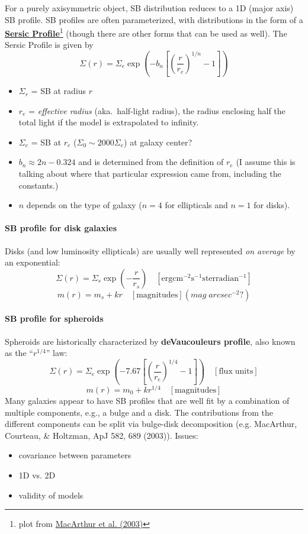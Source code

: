 \documentclass{article}
\newcommand{\mynotes}[1]{\textcolor{cadmiumgreen}{#1}}
\begin{document}
For a purely axisymmetric object, SB distribution reduces to a 1D
(major axis) SB profile.
SB profiles are often parameterized, with distributions in the form
of a
\href{http://astronomy.nmsu.edu/holtz/a555/html/diagrams/a616/sersic.htm}
{\textbf{Sersic Profile}}\footnote{plot from
\href{http://adsabs.harvard.edu/abs/2003ApJ...582..689M}
{MacArthur et al. (2003)}}
(though there are other forms that can be used as well).
The Sersic Profile is given by
\[
    \Sigma(r) = \Sigma_{e}\exp \left( -b_{n} \left[ \left(
    \frac{r}{r_{e}} \right) ^{1/n}-1 \right] \right)
    \]
\begin{itemize}
    \item $\Sigma_{r}$ = SB at radius $r$
    \item $r_{e}$ = \textit{effective radius} (aka.\ half-light radius),
        the radius enclosing half the
        total light if the model is extrapolated to infinity.
    \item $\Sigma_{e}$ = SB at $r_{e}$
        ($\Sigma_{0} \sim 2000\Sigma_{e}$) \mynotes{at galaxy center?}
    \item $b_{n} \approx 2n - 0.324$ and is determined from the definition of
        $r_{e}$ \mynotes{(I assume this is talking about where that particular
        expression came from, including the constants.)}
    \item $n$ depends on the type of galaxy ($n=4$ for ellipticals and $n=1$
        for disks).
\end{itemize}

\paragraph{SB profile for disk galaxies}
Disks (and low luminosity ellipticals) are usually well represented \emph{on
average} by an exponential:
\[
    \Sigma(r) = \Sigma_{s}\exp\left(-\frac{r}{r_{s}}\right)
    \quad \mathrm{[erg cm^{-2} s^{-1} sterradian^{-1}]}
    \]
\[
    m(r) = m_{s} + kr
    \quad \mathrm{[magnitudes]}
    (mag \; arcsec^{-2} ? )
    \]

\paragraph{SB profile for spheroids}
Spheroids are historically characterized by
\textbf{deVaucouleurs profile}, also known as the ``$r^{1/4}$'' law:
\[
    \Sigma(r) = \Sigma_e\exp\left(-7.67\left[\left(
    \frac{r}{r_e}\right)^{1/4}-1\right] \right)
    \quad\mathrm{[flux\;units]}
    \]
\[
    m(r) = m_{0} + kr^{1/4}
    \quad\mathrm{[magnitudes]}
    \]
Many galaxies appear to have SB profiles that are well fit by a combination of multiple
components, e.g., a bulge and a disk.
The contributions from the different components can be split
via bulge-disk decomposition (e.g.
MacArthur, Courteau, \& Holtzman, ApJ 582, 689 (2003)). Issues:
\begin{itemize}
    \item covariance between parameters
    \item 1D vs. 2D
    \item validity of models
\end{itemize}
\end{document}
